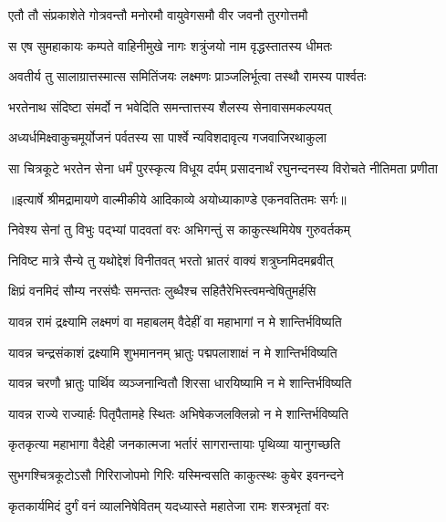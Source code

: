 \twolineshloka
{एतौ तौ संप्रकाशेते गोत्रवन्तौ मनोरमौ}
{वायुवेगसमौ वीर जवनौ तुरगोत्तमौ} %

\twolineshloka
{स एष सुमहाकायः कम्पते वाहिनीमुखे}
{नागः शत्रुंजयो नाम वृद्धस्तातस्य धीमतः} %

\twolineshloka
{अवतीर्य तु सालाग्रात्तस्मात्स समितिंजयः}
{लक्ष्मणः प्राञ्जलिर्भूत्वा तस्थौ रामस्य पार्श्वतः} %

\twolineshloka
{भरतेनाथ संदिष्टा संमर्दो न भवेदिति}
{समन्तात्तस्य शैलस्य सेनावासमकल्पयत्} %

\twolineshloka
{अध्यर्धमिक्ष्वाकुचमूर्योजनं पर्वतस्य सा}
{पार्श्वे न्यविशदावृत्य गजवाजिरथाकुला} %

\fourlineindentedshloka
{सा चित्रकूटे भरतेन सेना}
{ धर्मं पुरस्कृत्य विधूय दर्पम्}
{प्रसादनार्थं रघुनन्दनस्य}
{ विरोचते नीतिमता प्रणीता} %


{॥इत्यार्षे श्रीमद्रामायणे वाल्मीकीये आदिकाव्ये अयोध्याकाण्डे एकनवतितमः सर्गः॥}


\twolineshloka
{निवेश्य सेनां तु विभुः पद्भ्यां पादवतां वरः}
{अभिगन्तुं स काकुत्स्थमियेष गुरुवर्तकम्} %

\twolineshloka
{निविष्ट मात्रे सैन्ये तु यथोद्देशं विनीतवत्}
{भरतो भ्रातरं वाक्यं शत्रुघ्नमिदमब्रवीत्} %

\twolineshloka
{क्षिप्रं वनमिदं सौम्य नरसंघैः समन्ततः}
{लुब्धैश्च सहितैरेभिस्त्वमन्वेषितुमर्हसि} %

\twolineshloka
{यावन्न रामं द्रक्ष्यामि लक्ष्मणं वा महाबलम्}
{वैदेहीं वा महाभागां न मे शान्तिर्भविष्यति} %

\twolineshloka
{यावन्न चन्द्रसंकाशं द्रक्ष्यामि शुभमाननम्}
{भ्रातुः पद्मपलाशाक्षं न मे शान्तिर्भविष्यति} %

\twolineshloka
{यावन्न चरणौ भ्रातुः पार्थिव व्यञ्जनान्वितौ}
{शिरसा धारयिष्यामि न मे शान्तिर्भविष्यति} %

\twolineshloka
{यावन्न राज्ये राज्यार्हः पितृपैतामहे स्थितः}
{अभिषेकजलक्लिन्नो न मे शान्तिर्भविष्यति} %

\twolineshloka
{कृतकृत्या महाभागा वैदेही जनकात्मजा}
{भर्तारं सागरान्तायाः पृथिव्या यानुगच्छति} %

\twolineshloka
{सुभगश्चित्रकूटोऽसौ गिरिराजोपमो गिरिः}
{यस्मिन्वसति काकुत्स्थः कुबेर इवनन्दने} %

\twolineshloka
{कृतकार्यमिदं दुर्गं वनं व्यालनिषेवितम्}
{यदध्यास्ते महातेजा रामः शस्त्रभृतां वरः} %

